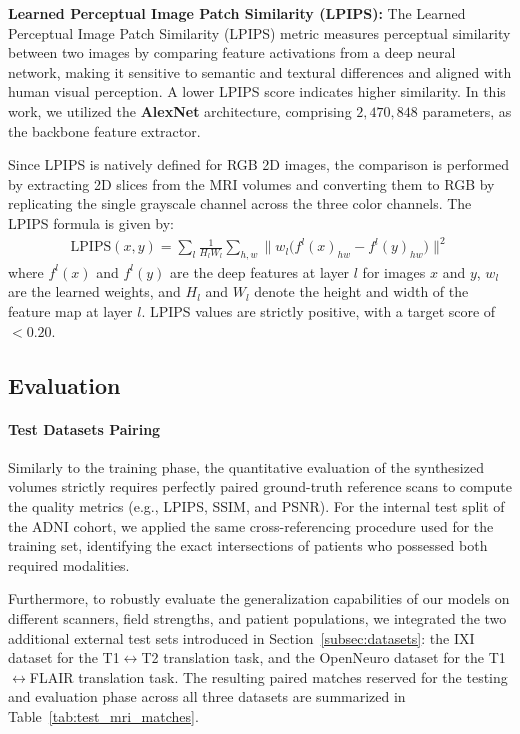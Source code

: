 \documentclass[11pt,a4paper]{article}
\begin{document}
\vspace{2mm}
\noindent
\textbf{Learned Perceptual Image Patch Similarity (LPIPS):} The Learned Perceptual Image Patch Similarity (LPIPS) metric \cite{zhang2018unreasonable} measures perceptual similarity between two images by comparing feature activations from a deep neural network, making it sensitive to semantic and textural differences and aligned with human visual perception. A lower LPIPS score indicates higher similarity. In this work, we utilized the \textbf{AlexNet} architecture, comprising $2{,}470{,}848$ parameters, as the backbone feature extractor. 

Since LPIPS is natively defined for RGB 2D images, the comparison is performed by extracting 2D slices from the MRI volumes and converting them to RGB by replicating the single grayscale channel across the three color channels. The LPIPS formula is given by:
\begin{align}
\text{LPIPS}(x, y) = \sum_l \frac{1}{H_l W_l} \sum_{h,w} \| w_l \big( f^l(x)_{hw} - f^l(y)_{hw} \big) \|^2
\end{align}
where \( f^l(x) \) and \( f^l(y) \) are the deep features at layer \( l \) for images \( x \) and \( y \), \( w_l \) are the learned weights, and \( H_l \) and \( W_l \) denote the height and width of the feature map at layer \( l \). LPIPS values are strictly positive, with a target score of $< 0.20$.

\subsection{Evaluation}

\paragraph{Test Datasets Pairing}
Similarly to the training phase, the quantitative evaluation of the synthesized volumes strictly requires perfectly paired ground-truth reference scans to compute the quality metrics (e.g., LPIPS, SSIM, and PSNR). For the internal test split of the ADNI cohort, we applied the same cross-referencing procedure used for the training set, identifying the exact intersections of patients who possessed both required modalities. 

Furthermore, to robustly evaluate the generalization capabilities of our models on different scanners, field strengths, and patient populations, we integrated the two additional external test sets introduced in Section~\ref{subsec:datasets}: the IXI dataset for the T1$\leftrightarrow$T2 translation task, and the OpenNeuro dataset for the T1$\leftrightarrow$FLAIR translation task. The resulting paired matches reserved for the testing and evaluation phase across all three datasets are summarized in Table~\ref{tab:test_mri_matches}.
\end{document}
